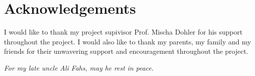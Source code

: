 \chapter*{Acknowledgements}
I would like to thank my project supivisor Prof. Mischa Dohler for his support throughout the project. I would also like to thank my parents, my family and my friends for their unwavering support and encouragement throughout the project.
\newpage
\vspace*{\fill}
\begin{center}
\textit{For my late uncle Ali Fahs, may he rest in peace.}
\end{center}
\vspace*{\fill}
